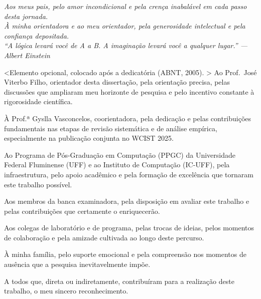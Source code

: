 \cleardoublepage
\thispagestyle{empty}
\vspace*{200mm}

\begin{flushright}
{\em 
  Aos meus pais, pelo amor incondicional e pela crença inabalável
  em cada passo desta jornada.\\[0.5cm]
  À minha orientadora e ao meu orientador,
  pela generosidade intelectual e pela confiança depositada.\\[0.5cm]
  \textit{``A lógica levará você de A a B.
  A imaginação levará você a qualquer lugar.''} --- Albert Einstein
}
\end{flushright}
\newpage


\hspace{5mm}
<Elemento opcional, colocado após a dedicatória (ABNT, 2005). >
Ao Prof.\ José Viterbo Filho, orientador desta dissertação, pela
  orientação precisa, pelas discussões que ampliaram meu horizonte de
  pesquisa e pelo incentivo constante à rigorosidade científica.
 
  À Prof.ª Gyslla Vasconcelos, coorientadora, pela dedicação e pelas
  contribuições fundamentais nas etapas de revisão sistemática e de
  análise empírica, especialmente na publicação conjunta no WCIST 2025.
 
  Ao Programa de Pós-Graduação em Computação (PPGC) da Universidade
  Federal Fluminense (UFF) e ao Instituto de Computação (IC-UFF),
  pela infraestrutura, pelo apoio acadêmico e pela formação de
  excelência que tornaram este trabalho possível.
 
  Aos membros da banca examinadora, pela disposição em avaliar este
  trabalho e pelas contribuições que certamente o enriquecerão.
 
  Aos colegas de laboratório e de programa, pelas trocas de ideias,
  pelos momentos de colaboração e pela amizade cultivada ao longo
  deste percurso.
 
  À minha família, pelo suporte emocional e pela compreensão nos
  momentos de ausência que a pesquisa inevitavelmente impõe.
 
  A todos que, direta ou indiretamente, contribuíram para a realização
  deste trabalho, o meu sincero reconhecimento.



